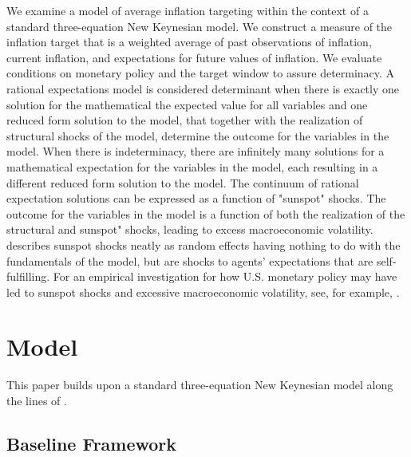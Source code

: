 \documentclass[english,authoryear,12pt]{elsarticle}
\begin{document}
We examine a model of average inflation targeting within the context of a standard three-equation New Keynesian model. We construct a measure of the inflation target that is a weighted average of past observations of inflation, current inflation, and expectations for future values of inflation. We evaluate conditions on monetary policy and the target window to assure determinacy. A rational expectations model is considered determinant when there is exactly one solution for the mathematical the expected value for all variables and one reduced form solution to the model, that together with the realization of structural shocks of the model, determine the outcome for the variables in the model. When there is indeterminacy, there are infinitely many solutions for a mathematical expectation for the variables in the model, each resulting in a different reduced form solution to the model. The continuum of rational expectation solutions can be expressed as a function of "sunspot" shocks. The outcome for the variables in the model is a function of both the realization of the structural and sunspot" shocks, leading to excess macroeconomic volatility. \cite{woodford1987} describes sunspot shocks neatly as random effects having nothing to do with the fundamentals of the model, but are shocks to agents' expectations that are self-fulfilling. For an empirical investigation for how U.S. monetary policy may have led to sunspot shocks and excessive macroeconomic volatility, see, for example, \cite{lubik2004}.

\section{\label{Model}Model}
This paper builds upon a standard three-equation New Keynesian model along the lines of \cite{clarida1999}.

\subsection{Baseline Framework}
\end{document}
